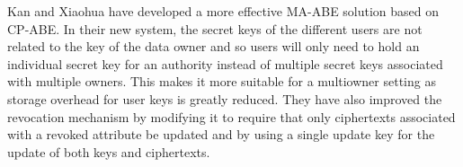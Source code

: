 Kan and Xiaohua\cite{Yang2014} have developed a more effective MA-ABE solution based on CP-ABE. In their new system, the secret keys of the different users are not related to the key of the data owner and so users will only need to hold an individual secret key for an authority instead of multiple secret keys associated with multiple owners. This makes it more suitable for a multiowner setting as storage overhead for user keys is greatly reduced. They have also improved the revocation mechanism by modifying it to require that only ciphertexts associated with a revoked attribute be updated and by using a single update key for the update of both keys and ciphertexts.





